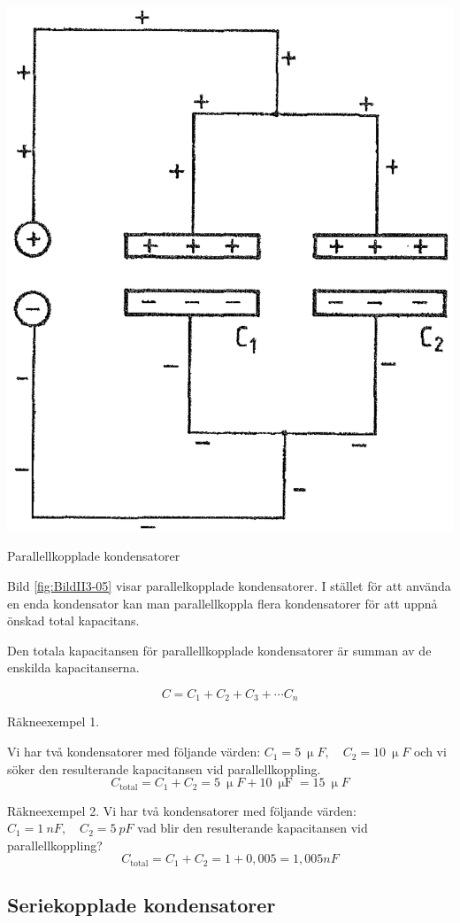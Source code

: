 \begin{marginfigure}%
  \includegraphics[width=.7\textwidth]{images/cropped_pdfs/bild_2_3-05.pdf}
  \caption{Parallellkopplade kondensatorer}
  \label{fig:BildII3-05}
\end{marginfigure}

Bild \ref{fig:BildII3-05} visar parallelkopplade kondensatorer.
I stället för att använda en enda kondensator kan man parallellkoppla flera
kondensatorer för att uppnå önskad total kapacitans.

Den totala kapacitansen för parallellkopplade kondensatorer är summan av de
enskilda kapacitanserna.

\[C = C_1 + C_2 + C_3 + \cdots C_n\]

\noindent Räkneexempel 1.

Vi har två kondensatorer med följande värden: \( C_1 =
\SI{5}{\upmu F}, \quad C_2 = \SI{10}{\upmu F} \) och vi söker den
resulterande kapacitansen vid parallellkoppling.
\[   C_{\text{total}} = C_1 + C_2 = \SI{5}{\upmu F} +
     \SI{10}{\upmu\farad} = \SI{15}{\upmu F}   \]



\noindent Räkneexempel 2. Vi har två kondensatorer med följande
värden: \(C_1 = \SI{1}{nF},\quad C_2 = \SI{5}{pF} \) vad blir den
resulterande kapacitansen vid parallellkoppling?
\[   C_{\text{total}} = C_1 + C_2 = 1 + 0,005 =
1,005\unit{nF} \]
 

\subsection{Seriekopplade kondensatorer}
 

